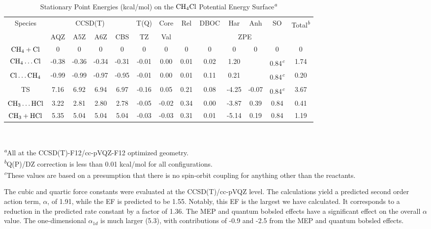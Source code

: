 \documentclass[journal=jpcafh,manuscript=article]{achemso}
\begin{document}
\begin{table}
\caption{Stationary Point Energies (kcal/mol) on the 
$\rm CH_4Cl$ Potential Energy Surface\textsuperscript{\emph{a}}}
\begin{tabular}{|ccccccccccccc|} \hline
  Species
  &\multicolumn{4}{c}{CCSD(T)}&T(Q)& Core&Rel
  &DBOC&Har&Anh&SO&Total\textsuperscript{\emph{b}}
  \\
  &AQZ&A5Z&A6Z&CBS&TZ&Val&&&\multicolumn{2}{c}{ZPE}&&
  \\ \hline
  $\rm CH_4+Cl$
  &0&0&0&0&0&0&0&0&0&0&0&0
  \\
  $\rm CH_4\ldots Cl$
  &-0.38&-0.36&-0.34&-0.31&-0.01&0.00&0.01&0.02&1.20&&0.84\textsuperscript{\emph{c}}&1.74
  \\
  $\rm Cl\ldots CH_4$
  &-0.99&-0.99&-0.97&-0.95&-0.01&0.00&0.01&0.11&0.21&&0.84\textsuperscript{\emph{c}}&0.20
  \\
  TS
  &7.16&6.92&6.94&6.97&-0.16&0.05&0.21&0.08&-4.25&-0.07&0.84\textsuperscript{\emph{c}}&3.67
  \\
  $\rm CH_3\ldots HCl$
  &3.22&2.81&2.80&2.78&-0.05&-0.02&0.34&0.00&-3.87&0.39&0.84&0.41
  \\
  $\rm CH_3+HCl$
  &5.35&5.04&5.04&5.04&-0.03&-0.03&0.31&0.01&-5.14&0.19&0.84&1.19
  \\ \hline
\end{tabular}\\
\begin{flushleft}
\textsuperscript{\emph{a}}All at the CCSD(T)-F12/cc-pVQZ-F12
optimized geometry.\\
\textsuperscript{\emph{b}}Q(P)/DZ correction is less than 0.01
kcal/mol for all configurations.\\
\textsuperscript{\emph{c}}These values are based on a presumption that there is no spin-orbit coupling for anything other than the reactants.
\end{flushleft}
\label{cl_ch4_tab}
\end{table}

The cubic and quartic force constants were evaluated at the
CCSD(T)/cc-pVQZ level. The calculations yield a predicted second order
action term, $\alpha$, of 1.91, while the EF is predicted to be
1.55. Notably, this EF is the largest we have calculated. It
corresponds to a reduction in the predicted rate constant by a factor
of 1.36. The MEP and quantum bobsled effects have a significant effect
on the overall $\alpha$ value. The one-dimensional $\alpha_{1d}$ is
much larger (5.3), with contributions of -0.9 and -2.5 from the MEP
and quantum bobsled effects.
\end{document}
